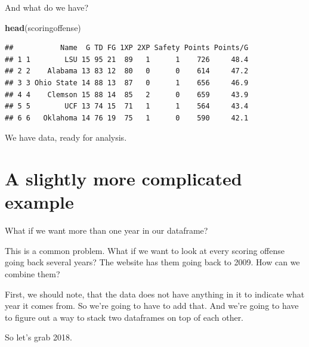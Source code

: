 \documentclass[
]{book}
\newenvironment{Shaded}{\begin{snugshade}}{\end{snugshade}}
\newcommand{\DataTypeTok}[1]{\textcolor[rgb]{0.13,0.29,0.53}{#1}}
\newcommand{\DecValTok}[1]{\textcolor[rgb]{0.00,0.00,0.81}{#1}}
\newcommand{\KeywordTok}[1]{\textcolor[rgb]{0.13,0.29,0.53}{\textbf{#1}}}
\newcommand{\NormalTok}[1]{#1}
\newcommand{\OperatorTok}[1]{\textcolor[rgb]{0.81,0.36,0.00}{\textbf{#1}}}
\newcommand{\StringTok}[1]{\textcolor[rgb]{0.31,0.60,0.02}{#1}}
\begin{document}
And what do we have?

\begin{Shaded}
\begin{Highlighting}[]
\KeywordTok{head}\NormalTok{(scoringoffense)}
\end{Highlighting}
\end{Shaded}

\begin{verbatim}
##           Name  G TD FG 1XP 2XP Safety Points Points/G
## 1 1        LSU 15 95 21  89   1      1    726     48.4
## 2 2    Alabama 13 83 12  80   0      0    614     47.2
## 3 3 Ohio State 14 88 13  87   0      1    656     46.9
## 4 4    Clemson 15 88 14  85   2      0    659     43.9
## 5 5        UCF 13 74 15  71   1      1    564     43.4
## 6 6   Oklahoma 14 76 19  75   1      0    590     42.1
\end{verbatim}

We have data, ready for analysis.

\hypertarget{a-slightly-more-complicated-example}{%
\section{A slightly more complicated example}\label{a-slightly-more-complicated-example}}

What if we want more than one year in our dataframe?

This is a common problem. What if we want to look at every scoring offense going back several years? The website has them going back to 2009. How can we combine them?

First, we should note, that the data does not have anything in it to indicate what year it comes from. So we're going to have to add that. And we're going to have to figure out a way to stack two dataframes on top of each other.

So let's grab 2018.

\begin{Shaded}
\end{Shaded}
\end{document}
